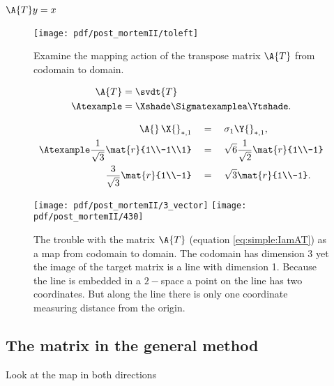 \subsubsection{$\A{T}y=x$}
\begin{figure}[htbp] %
   \centering
   \texttt{[image: pdf/post\_mortemII/toleft]} 
   \caption[The mapping action of the transpose matrix $\A{T}$]{Examine the mapping action of the transpose matrix $\A{T}$ from codomain to domain.}
   \label{fig:toright}
\end{figure}
\begin{equation}
  \begin{split}
    \A{T} &= \svdt{T} \\
    \Atexample &= \Xshade \Sigmatexamplea \Ytshade.
  \end{split}
  \label{eq:simple:IamAT}
\end{equation}

\begin{equation}
  \begin{split}
    \A{}\,\X{}_{*,1}\quad &= \quad \sigma_{1}\Y{}_{*,1}, \\
    \Atexample \frac{1}{\sqrt{3}}\mat{r}{1\\-1\\1} \quad & =  \quad \sqrt{6}\frac{1}{\sqrt{2}}\mat{r}{1\\-1}\\
    \frac{3}{\sqrt{3}}\mat{r}{1\\-1}  \quad & =  \quad \sqrt{3}\mat{r}{1\\-1}.
  \end{split}
\end{equation}

\begin{figure}[htbp] %
   \centering
   \texttt{[image: pdf/post\_mortemII/3\_vector]}  \qquad
   \texttt{[image: pdf/post\_mortemII/430]}
   \caption[The trouble with the matrix $\A{T}$]{The trouble with the matrix $\A{T}$ (equation \eqref{eq:simple:IamAT}) as a map from codomain to domain. The codomain has dimension 3 yet the image of the target matrix is a line with dimension 1. Because the line is embedded in a $2-$space a point on the line has two coordinates. But along the line there is only one coordinate measuring distance from the origin.}
   \label{fig:toleft}
\end{figure}

\subsection{The matrix in the general method}
Look at the map in both directions

